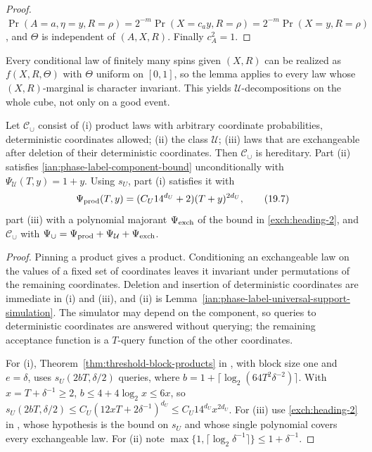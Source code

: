 \begin{proof}
\(\Pr(A=a,\eta=y,R=\rho)=2^{-m}\Pr(X=c_ay,R=\rho)=2^{-m}\Pr(X=y,R=\rho)\),
and \(\Theta\) is independent of \((A,X,R)\). Finally \(c_A^2=1\).
\end{proof}

Every conditional law of finitely many spins given \((X,R)\) can be
realized as \(f(X,R,\Theta)\) with \(\Theta\) uniform on \([0,1]\), so the
lemma applies to every law whose \((X,R)\)-marginal is character
invariant. This yields \(\mathcal U\)-decompositions on the whole cube,
not only on a good event.

\begin{proposition}
\label{ian:phase-label-union-class}
Let \(\mathcal C_\cup\) consist of
(i) product laws with arbitrary coordinate probabilities, deterministic
coordinates allowed;
(ii) the class \(\mathcal U\);
(iii) laws that are exchangeable after deletion of their deterministic
coordinates.
Then \(\mathcal C_\cup\) is hereditary. Part (ii) satisfies
\eqref{ian:phase-label-component-bound} unconditionally with
\(\Psi_{\mathcal U}(T,y)=1+y\). Using \(s_U\), part (i)
satisfies it with
\[
 \Psi_{\rm prod}(T,y)=(C_U14^{d_U}+2)(T+y)^{2d_U},
 \tag{19.7}\label{ian:phase-label-product-polynomial}
\]
part (iii) with a polynomial majorant \(\Psi_{\rm exch}\) of the bound in
\ref{exch:heading-2}, and \(\mathcal C_\cup\) with
\(\Psi_\cup=\Psi_{\rm prod}+\Psi_{\mathcal U}+\Psi_{\rm exch}\).
\end{proposition}

\begin{proof}
Pinning a product gives a product. Conditioning an exchangeable law on
the values of a fixed set of coordinates leaves it invariant under
permutations of the remaining coordinates. Deletion and insertion of
deterministic coordinates are immediate in (i) and (iii), and (ii) is
Lemma~\ref{ian:phase-label-universal-support-simulation}. The simulator
may depend on the component, so queries to deterministic coordinates
are answered without querying; the remaining acceptance function is a
\(T\)-query function of the other coordinates.

For (i), Theorem~\ref{thm:threshold-block-products} in
, with block
size one and \(e=\delta\), uses \(s_U(2bT,\delta/2)\) queries, where
\(b=1+\lceil\log_2(64T^2\delta^{-2})\rceil\). With \(x=T+\delta^{-1}\ge2\),
\(b\le4+4\log_2x\le6x\), so
\(s_U(2bT,\delta/2)\le C_U(12xT+2\delta^{-1})^{d_U}\le C_U14^{d_U}x^{2d_U}\).
For (iii) use \ref{exch:heading-2} in
, whose hypothesis
is the bound on \(s_U\) and whose single polynomial covers every
exchangeable law. For (ii) note
\(\max\{1,\lceil\log_2\delta^{-1}\rceil\}\le1+\delta^{-1}\).
\end{proof}

